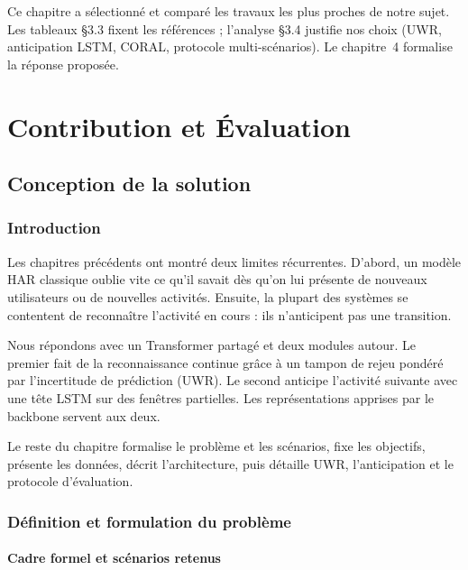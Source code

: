 \documentclass[a4paper,12pt]{report}
\begin{document}
Ce chapitre a sélectionné et comparé les travaux les plus proches de notre sujet.
Les tableaux §3.3 fixent les références ; l'analyse §3.4 justifie nos choix
(UWR, anticipation LSTM, CORAL, protocole multi-scénarios). Le chapitre~4
formalise la réponse proposée.

\clearpage



\part{Contribution et Évaluation}

\chapter{Conception de la solution}
\label{ch:09-Conception}

\section{Introduction}

Les chapitres précédents ont montré deux limites récurrentes. D'abord, un
modèle HAR classique oublie vite ce qu'il savait dès qu'on lui présente de
nouveaux utilisateurs ou de nouvelles activités. Ensuite, la plupart des
systèmes se contentent de reconnaître l'activité en cours : ils n'anticipent
pas une transition.

Nous répondons avec un Transformer partagé et deux modules autour. Le premier
fait de la reconnaissance continue grâce à un tampon de rejeu pondéré par
l'incertitude de prédiction (UWR). Le second anticipe l'activité suivante
avec une tête LSTM sur des fenêtres partielles. Les représentations apprises
par le backbone servent aux deux.

Le reste du chapitre formalise le problème et les scénarios, fixe les
objectifs, présente les données, décrit l'architecture, puis détaille UWR,
l'anticipation et le protocole d'évaluation.

\section{Définition et formulation du problème}

\subsection{Cadre formel et scénarios retenus}
\end{document}
